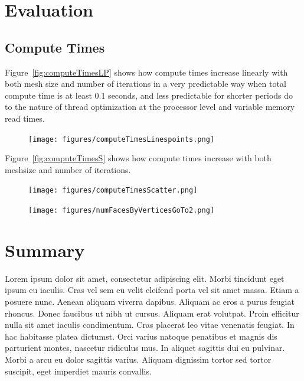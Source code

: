 \section{Evaluation}
\subsection{Compute Times}

Figure~\ref{fig:computeTimesLP} shows how compute times increase linearly with both mesh size and number of iterations in a very predictable way when total compute time is at least 0.1 seconds, and less predictable for shorter periods do to the nature of thread optimization at the processor level and variable memory read times.
\begin{figure}[ht]
	\centering
	\texttt{[image: figures/computeTimesLinespoints.png]}
\end{figure}

Figure~\ref{fig:computeTimesS} shows how compute times increase with both meshsize and number of iterations. 
\begin{figure}[ht]
	\centering
	\texttt{[image: figures/computeTimesScatter.png]}
\end{figure}

\begin{figure}[ht]
	\centering
	\texttt{[image: figures/numFacesByVerticesGoTo2.png]}
\end{figure}





\section{Summary}
Lorem ipsum dolor sit amet, consectetur adipiscing elit. Morbi tincidunt eget
ipsum eu iaculis. Cras vel sem eu velit eleifend porta vel sit amet massa. Etiam
a posuere nunc. Aenean aliquam viverra dapibus. Aliquam ac eros a purus feugiat
rhoncus. Donec faucibus ut nibh ut cursus. Aliquam erat volutpat. Proin efficitur
nulla sit amet iaculis condimentum. Cras placerat leo vitae venenatis feugiat. In
hac habitasse platea dictumst. Orci varius natoque penatibus et magnis dis
parturient montes, nascetur ridiculus mus. In aliquet sagittis dui eu pulvinar.
Morbi a arcu eu dolor sagittis varius. Aliquam dignissim tortor sed tortor
suscipit, eget imperdiet mauris convallis.
